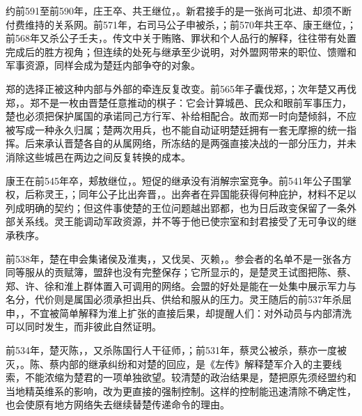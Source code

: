 约前591至前590年，庄王卒、共王继位，。新君接手的是一张尚可北进、却须不断付费维持的关系网。前571年，右司马公子申被杀，；前570年共王卒、康王继位，；前568年又杀公子壬夫，。传文中关于贿赂、罪状和个人品行的解释，往往带有处置完成后的胜方视角；但连续的处死与继承至少说明，对外盟网带来的职位、馈赠和军事资源，同样会成为楚廷内部争夺的对象。

郑的选择正被这种内部与外部的牵连反复改变。前565年子囊伐郑，；次年楚又再伐郑，。郑不是一枚由晋楚任意推动的棋子：它会计算城邑、民众和眼前军事压力，楚也必须把保护属国的承诺同己方行军、补给相配合。故而郑一时向楚倾斜，不应被写成一种永久归属；楚两次用兵，也不能自动证明楚廷拥有一套无摩擦的统一指挥。后来承认晋楚各自的从属网络，所冻结的是两强直接决战的一部分压力，并未消除这些城邑在两边之间反复转换的成本。

康王在前545年卒，郏敖继位，。短促的继承没有消解宗室竞争。前541年公子围掌权，后称灵王，；同年公子比出奔晋，。出奔者在异国能获得何种庇护，材料不足以列成明确的契约；但这件事使楚的王位问题越出郢都，也为日后政变保留了一条外部关系线。灵王能调动军政资源，并不等于他已使宗室和封君接受了无可争议的继承秩序。

前538年，楚在申会集诸侯及淮夷，，又伐吴、灭赖，。参会者的名单不是一张各方同等服从的贡赋簿，盟辞也没有完整保存；它所显示的，是楚灵王试图把陈、蔡、郑、许、徐和淮上群体置入可调用的网络。会盟的好处是能在一处集中展示军力与名分，代价则是属国必须承担出兵、供给和服从的压力。灵王随后的前537年杀屈申，，不宜被简单解释为淮上扩张的直接后果，却提醒人们：对外动员与内部清洗可以同时发生，而非彼此自然证明。

前534年，楚灭陈，，又杀陈国行人干征师，；前531年，蔡灵公被杀，蔡亦一度被灭，。陈、蔡内部的继承纠纷和对楚的回应，是《左传》解释楚军介入的主要线索，不能浓缩为楚君的一项单独欲望。较清楚的政治结果是，楚把原先须经盟约和当地精英维系的影响，改为更直接的强制控制。这样的控制能迅速清除不确定性，也会使原有地方网络失去继续替楚传递命令的理由。

